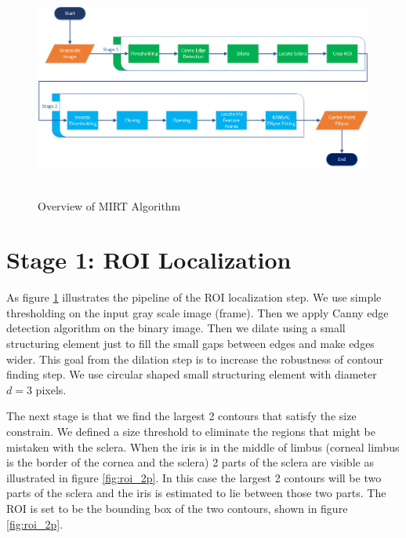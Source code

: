 \documentclass[12pt,fleqn]{book} %
\begin{document}
\begin{figure}[h]
\begin{dBox}
\centering
	\mbox{
		\includegraphics[width=\textwidth]{./Pictures/mirt/MIRT_overview.png}
	}
   \caption{Overview of MIRT Algorithm \label{fig:mirt_overview} }   
\end{dBox}   
\end{figure}


\section{Stage 1: ROI Localization}
As figure \ref{fig:mirt_overview} illustrates the pipeline of the ROI localization step. We use simple thresholding on the input gray scale image (frame). Then we apply Canny edge detection algorithm \cite{canny} on the binary image. Then we dilate using a small structuring element just to fill the small gaps between edges and make edges wider. This goal from the dilation step is to increase the robustness of contour finding step. We use circular shaped small structuring element with diameter $ d = 3 $ pixels. \bigskip

The next stage is that we find the largest 2 contours that satisfy the size constrain. We defined a size threshold to eliminate the regions that might be mistaken with the sclera. When the iris is in the middle of limbus (corneal limbus is the border of the cornea and the sclera) 2 parts of the sclera are visible as illustrated in figure \ref{fig:roi_2p}. In this case the largest 2 contours will be two parts of the sclera and the iris is estimated to lie between those two parts. The ROI is set to be the bounding box of the two contours, shown in figure \ref{fig:roi_2p}. \bigskip
\end{document}
